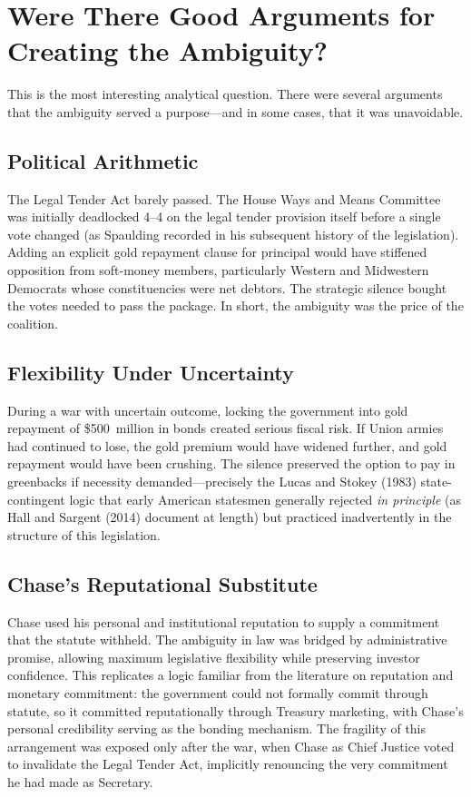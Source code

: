 \documentclass[12pt]{article}
\begin{document}
\section{Were There Good Arguments for Creating the Ambiguity?}

This is the most interesting analytical question. There were several
arguments that the ambiguity served a purpose---and in some cases, that
it was unavoidable.

\subsection{Political Arithmetic}

The Legal Tender Act barely passed. The House Ways and Means Committee
was initially deadlocked 4--4 on the legal tender provision itself before
a single vote changed (as Spaulding recorded in his subsequent history of
the legislation). Adding an explicit gold repayment clause for principal
would have stiffened opposition from soft-money members, particularly
Western and Midwestern Democrats whose constituencies were net debtors.
The strategic silence bought the votes needed to pass the package. In
short, the ambiguity was the price of the coalition.

\subsection{Flexibility Under Uncertainty}

During a war with uncertain outcome, locking the government into gold
repayment of \$500~million in bonds created serious fiscal risk. If Union
armies had continued to lose, the gold premium would have widened further,
and gold repayment would have been crushing. The silence preserved the
option to pay in greenbacks if necessity demanded---precisely the Lucas
and Stokey (1983) state-contingent logic that early American statesmen
generally rejected \textit{in principle} (as Hall and Sargent (2014)
document at length) but practiced inadvertently in the structure of this
legislation.

\subsection{Chase's Reputational Substitute}

Chase used his personal and institutional reputation to supply a
commitment that the statute withheld. The ambiguity in law was bridged
by administrative promise, allowing maximum legislative flexibility while
preserving investor confidence. This replicates a logic familiar from the
literature on reputation and monetary commitment: the government could not
formally commit through statute, so it committed reputationally through
Treasury marketing, with Chase's personal credibility serving as the
bonding mechanism. The fragility of this arrangement was exposed only
after the war, when Chase as Chief Justice voted to invalidate the Legal
Tender Act, implicitly renouncing the very commitment he had made as
Secretary.
\end{document}

